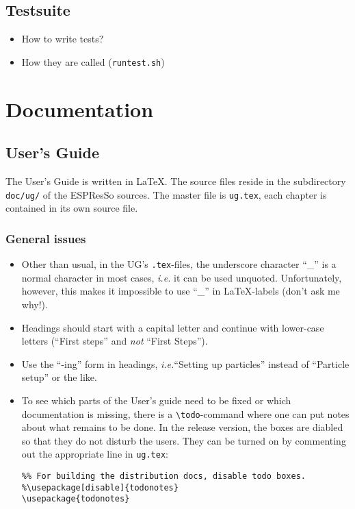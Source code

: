 \documentclass[
a4paper,                        %
11pt,                           %
twoside,                        %
footsepline,                    %
headsepline,                    %
headexclude,                    %
footexclude,                    %
pagesize,                       %
bibtotocnumbered,               %
idxtotoc                        %
]{scrreprt}
\newcommand{\es}{\mbox{\textsf{ESPResSo}}\xspace}
\newcommand{\ie}{\textit{i.e.}\xspace}
\begin{document}
\section{Testsuite}
\label{sec:testsuite}

\begin{itemize}
\item How to write tests?
\item How they are called (\texttt{runtest.sh})
\end{itemize}

\chapter{Documentation}

\section{User's Guide}

The User's Guide is written in \LaTeX. The source files reside in the
subdirectory \texttt{doc/ug/} of the \es sources. The master file is
\texttt{ug.tex}, each chapter is contained in its own source file.

\subsection{General issues}

\begin{itemize}
\item Other than usual, in the UG's \texttt{.tex}-files, the
  underscore character ``\_'' is a normal character in most cases, \ie
  it can be used unquoted. Unfortunately, however, this makes it
  impossible to use ``\_'' in \LaTeX-labels (don't ask me why!).
\item Headings should start with a capital letter and continue with
  lower-case letters (``First steps'' and \emph{not} ``First Steps'').
\item Use the ``-ing'' form in headings, \ie ``Setting up particles''
  instead of ``Particle setup'' or the like.
\item To see which parts of the User's guide need to be fixed or which
  documentation is missing, there is a \verb!\todo!-command where one
  can put notes about what remains to be done. In the release version,
  the boxes are diabled so that they do not disturb the users. They
  can be turned on by commenting out the appropriate line in
  \texttt{ug.tex}:
\begin{verbatim}
%% For building the distribution docs, disable todo boxes.
%\usepackage[disable]{todonotes}
\usepackage{todonotes}
\end{verbatim}

\end{itemize}
\end{document}
